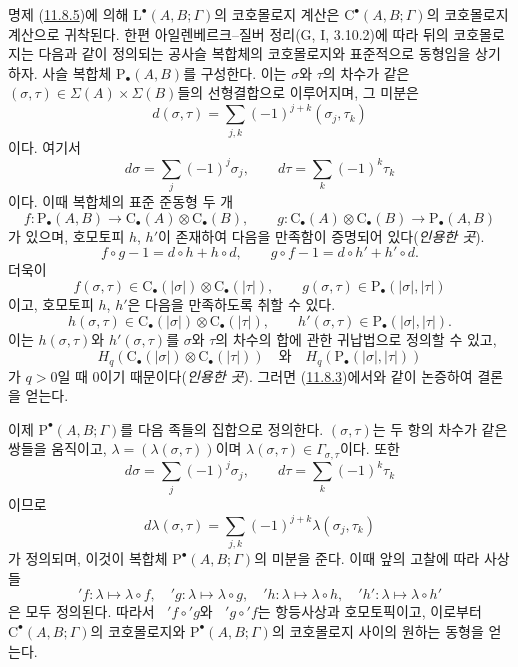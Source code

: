 \begin{env}[11.8.6]
\label{0.11.8.6-fr}
명제 (\hyperref[0.11.8.5-fr]{11.8.5})에 의해
$\mathrm L^\bullet(A,B;\Gamma)$의 코호몰로지 계산은
$\mathrm C^\bullet(A,B;\Gamma)$의 코호몰로지 계산으로 귀착된다. 한편
아일렌베르크--질버 정리(G, I, 3.10.2)에 따라 뒤의 코호몰로지는 다음과
같이 정의되는 공사슬 복합체의 코호몰로지와 표준적으로 동형임을 상기하자.
사슬 복합체 $\mathrm P_\bullet(A,B)$를 구성한다. 이는 $\sigma$와 $\tau$의
차수가 같은 $(\sigma,\tau)\in\Sigma(A)\times\Sigma(B)$들의 선형결합으로
이루어지며, 그 미분은
\[
d(\sigma,\tau)=\sum_{j,k}(-1)^{j+k}(\sigma_j,\tau_k)
\]
이다. 여기서
\[
d\sigma=\sum_j(-1)^j\sigma_j,\qquad
d\tau=\sum_k(-1)^k\tau_k
\]
이다. 이때 복합체의 표준 준동형 두 개
\[
f:\mathrm P_\bullet(A,B)\longrightarrow
\mathrm C_\bullet(A)\otimes\mathrm C_\bullet(B),\qquad
g:\mathrm C_\bullet(A)\otimes\mathrm C_\bullet(B)
\longrightarrow\mathrm P_\bullet(A,B)
\]
가 있으며, 호모토피 $h$, $h'$이 존재하여 다음을 만족함이
증명되어 있다(\emph{인용한 곳}).
\[
f\circ g-1=d\circ h+h\circ d,\qquad
g\circ f-1=d\circ h'+h'\circ d.
\]
더욱이
\[
f(\sigma,\tau)\in\mathrm C_\bullet(|\sigma|)
\otimes\mathrm C_\bullet(|\tau|),\qquad
g(\sigma,\tau)\in\mathrm P_\bullet(|\sigma|,|\tau|)
\]
이고, 호모토피 $h$, $h'$은 다음을 만족하도록 취할 수 있다.
\[
h(\sigma,\tau)\in\mathrm C_\bullet(|\sigma|)
\otimes\mathrm C_\bullet(|\tau|),\qquad
h'(\sigma,\tau)\in\mathrm P_\bullet(|\sigma|,|\tau|).
\]
이는 $h(\sigma,\tau)$와 $h'(\sigma,\tau)$를 $\sigma$와 $\tau$의 차수의
합에 관한 귀납법으로 정의할 수 있고,
\[
H_q(\mathrm C_\bullet(|\sigma|)\otimes\mathrm C_\bullet(|\tau|))
\quad\text{와}\quad
H_q(\mathrm P_\bullet(|\sigma|,|\tau|))
\]
가 $q>0$일 때 $0$이기 때문이다(\emph{인용한 곳}). 그러면
(\hyperref[0.11.8.3-fr]{11.8.3})에서와 같이 논증하여 결론을 얻는다.

이제 $\mathrm P^\bullet(A,B;\Gamma)$를 다음 족들의 집합으로 정의한다.
$(\sigma,\tau)$는 두 항의 차수가 같은 쌍들을 움직이고,
$\lambda=(\lambda(\sigma,\tau))$이며
$\lambda(\sigma,\tau)\in\Gamma_{\sigma,\tau}$이다. 또한
\[
d\sigma=\sum_j(-1)^j\sigma_j,\qquad
d\tau=\sum_k(-1)^k\tau_k
\]
이므로
\[
d\lambda(\sigma,\tau)=
\sum_{j,k}(-1)^{j+k}\lambda(\sigma_j,\tau_k)
\]
가 정의되며, 이것이 복합체 $\mathrm P^\bullet(A,B;\Gamma)$의 미분을
준다. 이때 앞의 고찰에 따라 사상들
\[
{}'f:\lambda\mapsto\lambda\circ f,\quad
{}'g:\lambda\mapsto\lambda\circ g,\quad
{}'h:\lambda\mapsto\lambda\circ h,\quad
{}'h':\lambda\mapsto\lambda\circ h'
\]
은 모두 정의된다. 따라서 $\mathop{}'f\circ{}'g$와
$\mathop{}'g\circ{}'f$는 항등사상과 호모토픽이고, 이로부터
$\mathrm C^\bullet(A,B;\Gamma)$의 코호몰로지와
$\mathrm P^\bullet(A,B;\Gamma)$의 코호몰로지 사이의 원하는 동형을
얻는다.
\end{env}

